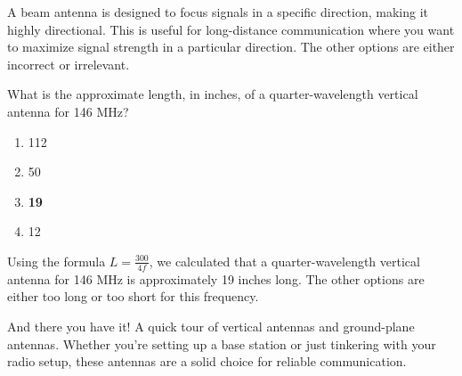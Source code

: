 A beam antenna is designed to focus signals in a specific direction, making it highly directional. This is useful for long-distance communication where you want to maximize signal strength in a particular direction. The other options are either incorrect or irrelevant.

\begin{tcolorbox}[colback=gray!10!white,colframe=black!75!black,title={T9A08}]
    What is the approximate length, in inches, of a quarter-wavelength vertical antenna for 146 MHz?
    \begin{enumerate}[label=\Alph*),noitemsep]
        \item 112
        \item 50
        \item \textbf{19}
        \item 12
    \end{enumerate}
\end{tcolorbox}

Using the formula \( L = \frac{300}{4f} \), we calculated that a quarter-wavelength vertical antenna for 146 MHz is approximately 19 inches long. The other options are either too long or too short for this frequency.

And there you have it! A quick tour of vertical antennas and ground-plane antennas. Whether you're setting up a base station or just tinkering with your radio setup, these antennas are a solid choice for reliable communication.
